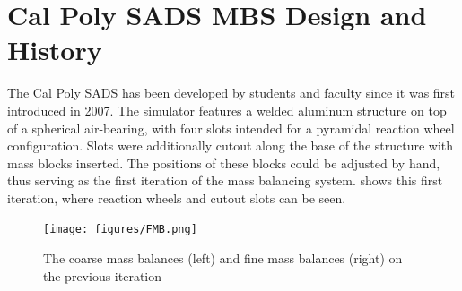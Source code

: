 \section{Cal Poly SADS MBS Design and History} 

The Cal Poly SADS has been developed by students and faculty since it was first introduced in 2007. The simulator features a welded aluminum structure on top of a spherical air-bearing, with four slots intended for a pyramidal reaction wheel configuration. Slots were additionally cutout along the base of the structure with mass blocks inserted. The positions of these blocks could be adjusted by hand, thus serving as the first iteration of the mass balancing system.  shows this first iteration, where reaction wheels and cutout slots can be seen.

\begin{figure}[h]\label{fig:gillman_final_work}
    \centering
    \texttt{[image: figures/FMB.png]}
    \caption{The coarse mass balances (left) and fine mass balances (right) on the previous iteration~\cite{gilman_automatic_2024}}
\end{figure}

